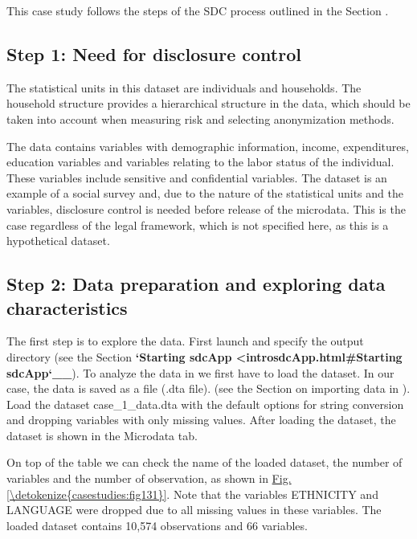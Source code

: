 \documentclass[letterpaper,10pt,english]{sphinxmanual}
\begin{document}
This case study follows the steps of the SDC process outlined in the Section
.


\subsection{Step 1: Need for disclosure control}
\label{\detokenize{casestudies:step-1-need-for-disclosure-control}}
The statistical units in this dataset are individuals and households.
The household structure provides a hierarchical structure in the data,
which should be taken into account when measuring risk and selecting
anonymization methods.

The data contains variables with demographic information, income,
expenditures, education variables and variables relating to the labor
status of the individual. These variables include sensitive and
confidential variables. The dataset is an example of a social survey
and, due to the nature of the statistical units and the variables,
disclosure control is needed before release of the microdata. This is
the case regardless of the legal framework, which is not specified here,
as this is a hypothetical dataset.


\subsection{Step 2: Data preparation and exploring data characteristics}
\label{\detokenize{casestudies:step-2-data-preparation-and-exploring-data-characteristics}}
The first step is to explore the data. First launch  and specify the
output directory (see the Section
{\color{red}\bfseries{}{}`Starting sdcApp \textless{}introsdcApp.html\#Starting sdcApp{}`\_\_}). To analyze the data in  we
first have to load the dataset.
In our case, the data is saved as a  file (.dta file). (see the Section
on importing data in ). Load the dataset case\_1\_data.dta with the default
options for string conversion and dropping variables with only missing values.
After loading the dataset, the dataset is shown in the Microdata tab.

On top of the table we can check the name of the loaded dataset,
the number of variables and the number of
observation, as shown in \hyperref[\detokenize{casestudies:fig131}]{Fig.\@ \ref{\detokenize{casestudies:fig131}}}. Note that the variables ETHNICITY and
LANGUAGE were dropped due to all missing values in these variables. The loaded
dataset contains 10,574 observations and 66 variables.
\end{document}
